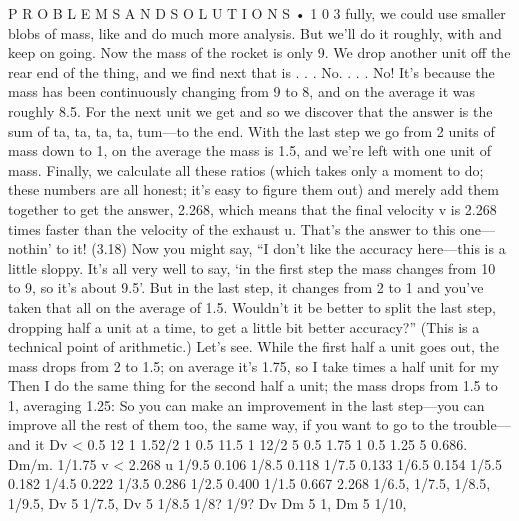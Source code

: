 \documentclass[10pt,oneside]{article}
\begin{document}
P R O B L E M S  A N D  S O L U T I O N S • 1 0 3 fully, we could use smaller blobs of mass, like and do much more analysis. But we’ll do it roughly, with and keep on going. Now the mass of the rocket is only 9. We drop another unit off the rear end of the thing, and we find next that is . . . No. . . . No! It’s because the mass has been continuously changing from 9 to 8, and on the average it was roughly 8.5. For the next unit we get and so we discover that the answer is the sum of ta, ta, ta, ta, tum---to the end. With the last step we go from 2 units of mass down to 1, on the average the mass is 1.5, and we’re left with one unit of mass. Finally, we calculate all these ratios (which takes only a moment to do; these numbers are all honest; it’s easy to figure them out) and merely add them together to get the answer, 2.268, which means that the final velocity v is 2.268 times faster than the velocity of the exhaust u. That’s the answer to this one---nothin’ to it! (3.18) Now you might say, “I don’t like the accuracy here---this is a little sloppy. It’s all very well to say, ‘in the first step the mass changes from 10 to 9, so it’s about 9.5’. But in the last step, it changes from 2 to 1 and you’ve taken that all on the average of 1.5. Wouldn’t it be better to split the last step, dropping half a unit at a time, to get a little bit better accuracy?” (This is a technical point of arithmetic.) Let’s see. While the first half a unit goes out, the mass drops from 2 to 1.5; on average it’s 1.75, so I take times a half unit for my Then I do the same thing for the second half a unit; the mass drops from 1.5 to 1, averaging 1.25: So you can make an improvement in the last step---you can improve all the rest of them too, the same way, if you want to go to the trouble---and it Dv < 0.5 12 1 1.52/2 1 0.5 11.5 1  12/2 5 0.5 1.75 1 0.5 1.25 5 0.686. Dm/m. 1/1.75 v < 2.268 u 1/9.5 0.106 1/8.5 0.118 1/7.5 0.133 1/6.5 0.154 1/5.5 0.182 1/4.5 0.222 1/3.5 0.286 1/2.5 0.400 1/1.5 0.667 2.268 1/6.5, 1/7.5, 1/8.5, 1/9.5, Dv 5 1/7.5, Dv 5 1/8.5 1/8? 1/9? Dv Dm 5 1, Dm 5 1/10,\par
\end{document}
